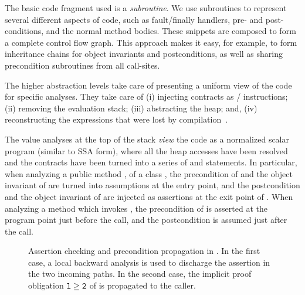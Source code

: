 \documentclass{elsart}
\begin{document}
The basic code fragment used is a \emph{subroutine}. We use subroutines to
represent several different aspects of code, such as fault/finally
handlers, pre- and post-conditions, and the normal method bodies. These
snippets are composed to form a complete control flow
graph. This approach makes it easy, for example, to form inheritance
chains for object invariants and postconditions, as well as sharing
precondition subroutines from all call-sites.

The higher abstraction levels take care of presenting a uniform view of the
code for specific analyses. They take care of
(i) injecting contracts as /  instructions;
(ii) removing the evaluation stack; (iii) abstracting the heap; and, (iv)
reconstructing the expressions that were lost by compilation~\cite{LogozzoMaf08-2}.

The value analyses at the top of the stack \emph{view} the code as a
normalized scalar program (similar to SSA form), where all the heap accesses have been
resolved and the contracts have been turned into a series of
 and  statements.  In particular, when
analyzing a public method , of a class , the
precondition of  and the object invariant of  are
turned into assumptions at the entry point, and the postcondition and
the object invariant of  are injected as assertions at the
exit point of .  When analyzing a method which invokes
, the precondition of  is asserted at the program
point just before the call, and the postcondition is assumed just
after the call.

\begin{figure}[t]
\centering
{}
\qquad
{}
\caption{Assertion checking and precondition propagation in
  \Clousot{}. In the first case, a local backward analysis is used to
  discharge the assertion in the two incoming paths. In the second case,
  the implicit proof obligation $\mathtt{l \geq 2}$ of 
  is propagated to the caller. 
}


\end{figure}
\end{document}
